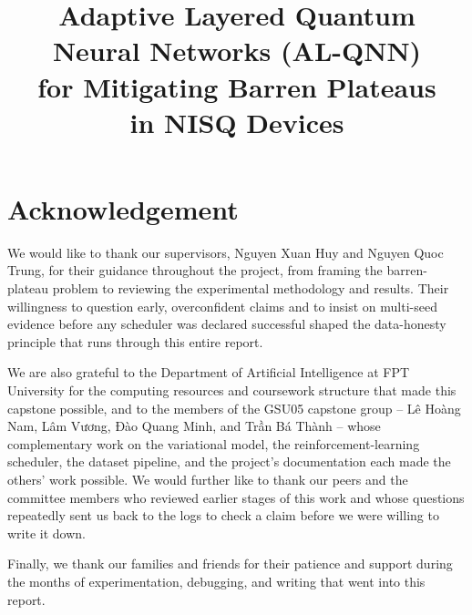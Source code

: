 \documentclass[11pt,fleqn]{article}
\title{Adaptive Layered Quantum \\ Neural Networks (AL-QNN) \\ for Mitigating Barren Plateaus \\ in NISQ Devices}  %
\begin{document}
\pagestyle{empty}
\maketitle
\pagestyle{plain}


\tableofcontents

\cleardoublepage
{}
\listoffigures
\cleardoublepage
{}
\listoftables
\cleardoublepage

\section*{Acknowledgement}
We would like to thank our supervisors, Nguyen Xuan Huy and Nguyen Quoc Trung, for their guidance throughout
the project, from framing the barren-plateau problem to reviewing the experimental methodology and results.
Their willingness to question early, overconfident claims and to insist on multi-seed evidence before any
scheduler was declared successful shaped the data-honesty principle that runs through this entire report.

We are also grateful to the Department of Artificial Intelligence at FPT University for the computing
resources and coursework structure that made this capstone possible, and to the members of the GSU05
capstone group -- Lê Hoàng Nam, Lâm Vương, Đào Quang Minh, and Trần Bá Thành -- whose complementary work
on the variational model, the reinforcement-learning scheduler, the dataset pipeline, and the project's
documentation each made the others' work possible. We would further like to thank our peers and the
committee members who reviewed earlier stages of this work and whose questions repeatedly sent us back
to the logs to check a claim before we were willing to write it down.

Finally, we thank our families and friends for their patience and support during the months of
experimentation, debugging, and writing that went into this report.

\clearpage
\end{document}
